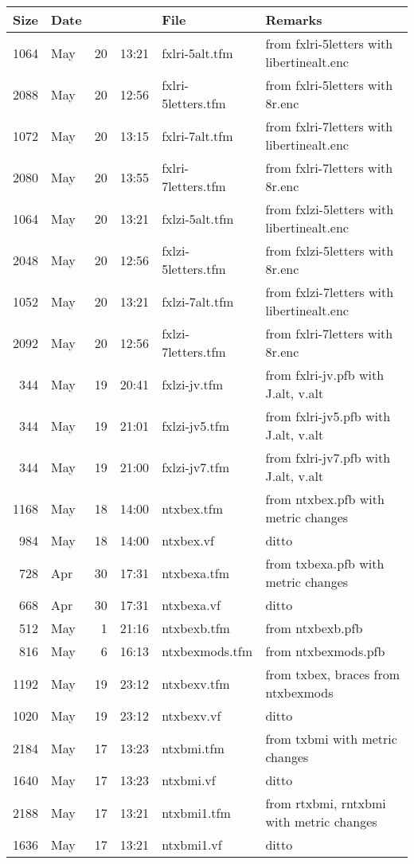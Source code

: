 \documentclass[10pt]{amsart}
\begin{document}
\begin{center}

  \begin{longtable}{@{} rlrrll @{}}
    \toprule
    Size & Date &  &  & File & Remarks \\ 
    \midrule
1064&May&20&13:21&fxlri-5alt.tfm& from fxlri-5letters with libertinealt.enc\\
2088&May&20&12:56&fxlri-5letters.tfm& from fxlri-5letters with 8r.enc\\
1072&May&20&13:15&fxlri-7alt.tfm& from fxlri-7letters with libertinealt.enc\\
2080&May&20&13:55&fxlri-7letters.tfm& from fxlri-7letters with 8r.enc\\
1064&May&20&13:21&fxlzi-5alt.tfm& from fxlzi-5letters with libertinealt.enc\\
2048&May&20&12:56&fxlzi-5letters.tfm& from fxlzi-5letters with 8r.enc\\
1052&May&20&13:21&fxlzi-7alt.tfm& from fxlzi-7letters with libertinealt.enc\\
2092&May&20&12:56&fxlzi-7letters.tfm& from fxlri-7letters with 8r.enc\\
344&May&19&20:41&fxlzi-jv.tfm& from fxlri-jv.pfb with J.alt, v.alt\\
344&May&19&21:01&fxlzi-jv5.tfm& from fxlri-jv5.pfb with J.alt, v.alt\\
344&May&19&21:00&fxlzi-jv7.tfm& from fxlri-jv7.pfb  with J.alt, v.alt\\
1168&May&18&14:00&ntxbex.tfm& from ntxbex.pfb with metric changes\\
984&May&18&14:00&ntxbex.vf& ditto\\
728&Apr&30&17:31&ntxbexa.tfm& from txbexa.pfb with metric changes\\
668&Apr&30&17:31&ntxbexa.vf& ditto\\
512&May&1&21:16&ntxbexb.tfm&  from ntxbexb.pfb\\
816&May&6&16:13&ntxbexmods.tfm& from ntxbexmods.pfb\\
1192&May&19&23:12&ntxbexv.tfm& from txbex, braces from ntxbexmods\\
1020&May&19&23:12&ntxbexv.vf& ditto\\
2184&May&17&13:23&ntxbmi.tfm& from txbmi with metric changes\\
1640&May&17&13:23&ntxbmi.vf& ditto\\
2188&May&17&13:21&ntxbmi1.tfm& from rtxbmi, rntxbmi with metric changes\\
1636&May&17&13:21&ntxbmi1.vf& ditto\\

\end{longtable}
\end{center}
\end{document}
